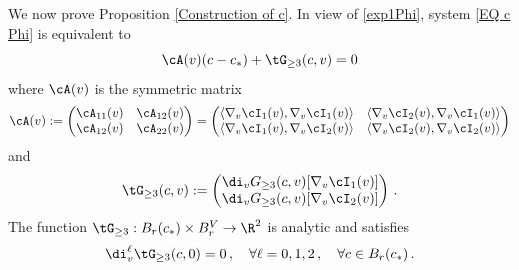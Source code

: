 \documentclass[11pt,a4paper,reqno]{article}
\numberwithin{equation}{section}
\theoremstyle{definition}
\begin{document}
We now prove Proposition \ref{Construction of c}. 
 In view of
\eqref{exp1Phi},  
system \eqref{EQ c Phi} is equivalent to
    \begin{equation}\label{EQ' c}
    \cA(v)(c-c_*)+ \tG_{\geq 3}(c,v)
         = 0
    \end{equation}
    where $  \cA (v) $ is  the  
    symmetric matrix
    \begin{equation}\label{Def a}
        \cA (v) :=
        \begin{pmatrix}
            \cA_{11} (v)  & \cA_{12} (v)   \\
             \cA_{12} (v)  &  \cA_{22} (v) 
        \end{pmatrix}  = 
        \begin{pmatrix}
            \langle \nabla_v \cI_1(v), \nabla_v \cI_1(v)\rangle  &
            \langle \nabla_v \cI_2(v), \nabla_v \cI_1(v)\rangle \\
            \langle \nabla_v \cI_1(v), \nabla_v \cI_2(v)\rangle  &
            \langle \nabla_v \cI_2(v), \nabla_v \cI_2(v)\rangle 
        \end{pmatrix}  
    \end{equation} 
and  
$$ 
\tG_{\geq 3}(c,v) 
:= \begin{pmatrix}
\di_v G_{\geq 3}(c,v)[\nabla_v \cI_1(v)] 
\\    
\di_v G_{\geq 3}(c,v)[\nabla_v \cI_2 (v)]
\end{pmatrix} \, . 
$$ 
The function 
$ \tG_{\geq 3} : B_r (c_*)\times B_r^V \to \R^2 $ is analytic and satisfies 
\begin{equation}\label{Ggeq3}
\di_v^\ell \tG_{\geq 3} (c,0) = 0 \, , \quad 
\forall \ell = 0,1,2\, , \quad \forall c \in B_r (c_*) \, . 
\end{equation}
\end{document}
